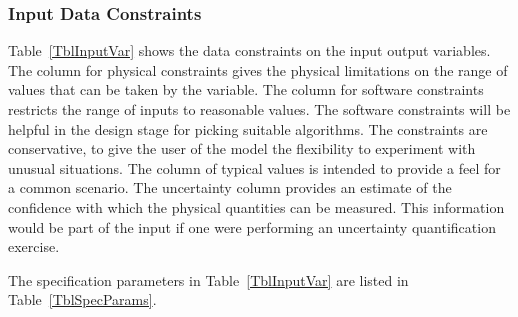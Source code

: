 \documentclass[12pt]{article}
\begin{document}



\subsubsection{Input Data Constraints} \label{sec-DataConstraints}

Table~\ref{TblInputVar} shows the data constraints on the input output
variables.  The column for physical constraints gives the physical limitations
on the range of values that can be taken by the variable.  The column for
software constraints restricts the range of inputs to reasonable values.  The
software constraints will be helpful in the design stage for picking suitable
algorithms.  The constraints are conservative, to give the user of the model the
flexibility to experiment with unusual situations.  The column of typical values
is intended to provide a feel for a common scenario.  The uncertainty column
provides an estimate of the confidence with which the physical quantities can be
measured.  This information would be part of the input if one were performing an
uncertainty quantification exercise.

The specification parameters in Table~\ref{TblInputVar} are listed in
Table~\ref{TblSpecParams}.
\end{document}
